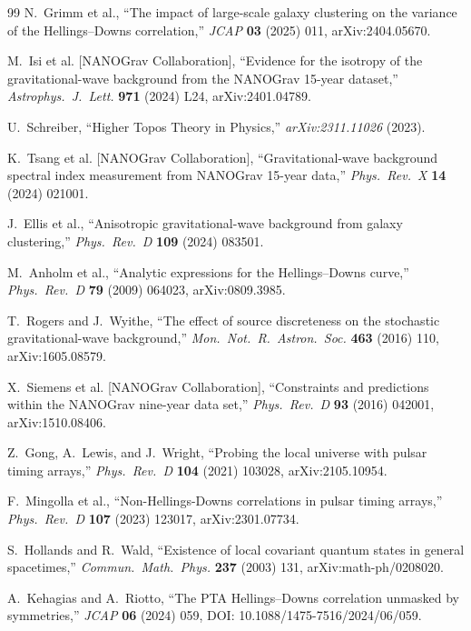 \documentclass[11pt,a4paper]{article}
\begin{document}
\begin{thebibliography}{99}
N.~Grimm et al.,
``The impact of large-scale galaxy clustering on the variance of the Hellings--Downs correlation,''
\textit{JCAP} \textbf{03} (2025) 011, arXiv:2404.05670.

M.~Isi et al. [NANOGrav Collaboration],
``Evidence for the isotropy of the gravitational-wave background from the NANOGrav 15-year dataset,''
\textit{Astrophys.\ J.\ Lett.} \textbf{971} (2024) L24, arXiv:2401.04789.

U.~Schreiber,
``Higher Topos Theory in Physics,''
\textit{arXiv:2311.11026} (2023).

K.~Tsang et al. [NANOGrav Collaboration],
``Gravitational-wave background spectral index measurement from NANOGrav 15-year data,''
\textit{Phys.\ Rev.\ X} \textbf{14} (2024) 021001.

J.~Ellis et al.,
``Anisotropic gravitational-wave background from galaxy clustering,''
\textit{Phys.\ Rev.\ D} \textbf{109} (2024) 083501.

M.~Anholm et al.,
``Analytic expressions for the Hellings--Downs curve,''
\textit{Phys.\ Rev.\ D} \textbf{79} (2009) 064023, arXiv:0809.3985.

T.~Rogers and J.~Wyithe,
``The effect of source discreteness on the stochastic gravitational-wave background,''
\textit{Mon.\ Not.\ R.\ Astron.\ Soc.} \textbf{463} (2016) 110, arXiv:1605.08579.

X.~Siemens et al. [NANOGrav Collaboration],
``Constraints and predictions within the NANOGrav nine-year data set,''
\textit{Phys.\ Rev.\ D} \textbf{93} (2016) 042001, arXiv:1510.08406.

Z.~Gong, A.~Lewis, and J.~Wright,
``Probing the local universe with pulsar timing arrays,''
\textit{Phys.\ Rev.\ D} \textbf{104} (2021) 103028, arXiv:2105.10954.

F.~Mingolla et al.,
``Non-Hellings-Downs correlations in pulsar timing arrays,''
\textit{Phys.\ Rev.\ D} \textbf{107} (2023) 123017, arXiv:2301.07734.

S.~Hollands and R.~Wald,
``Existence of local covariant quantum states in general spacetimes,''
\textit{Commun.\ Math.\ Phys.} \textbf{237} (2003) 131, arXiv:math-ph/0208020.

A.~Kehagias and A.~Riotto,
``The PTA Hellings--Downs correlation unmasked by symmetries,''
\textit{JCAP} \textbf{06} (2024) 059, DOI: 10.1088/1475-7516/2024/06/059.
\end{thebibliography}
\end{document}
